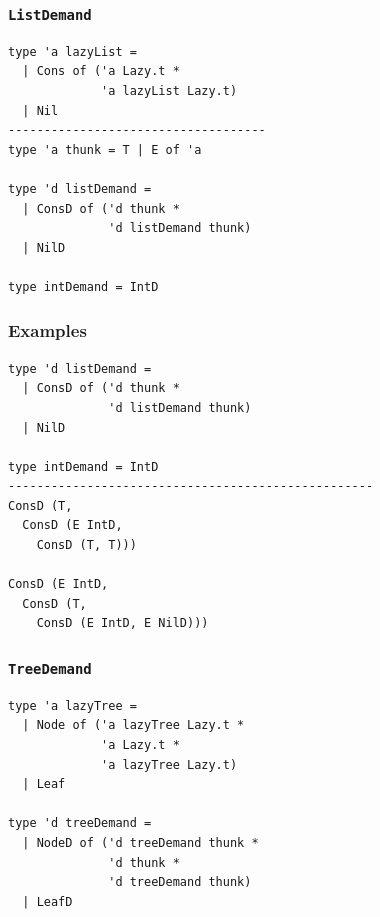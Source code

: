\documentclass{beamer}
\begin{document}
\begin{frame}[fragile]
\frametitle{\texttt{ListDemand}}
\begin{verbatim}
type 'a lazyList =
  | Cons of ('a Lazy.t *
             'a lazyList Lazy.t)
  | Nil
------------------------------------
type 'a thunk = T | E of 'a

type 'd listDemand =
  | ConsD of ('d thunk *
              'd listDemand thunk)
  | NilD

type intDemand = IntD
\end{verbatim}
\end{frame}


\begin{frame}[fragile]
\frametitle{Examples}
\begin{verbatim}
type 'd listDemand =
  | ConsD of ('d thunk *
              'd listDemand thunk)
  | NilD

type intDemand = IntD
---------------------------------------------------
ConsD (T,
  ConsD (E IntD,
    ConsD (T, T)))

ConsD (E IntD,
  ConsD (T,
    ConsD (E IntD, E NilD)))
\end{verbatim}
\end{frame}


\begin{frame}[fragile]
\frametitle{\texttt{TreeDemand}}
\begin{verbatim}
type 'a lazyTree =
  | Node of ('a lazyTree Lazy.t *
             'a Lazy.t *
             'a lazyTree Lazy.t)
  | Leaf

type 'd treeDemand =
  | NodeD of ('d treeDemand thunk *
              'd thunk *
              'd treeDemand thunk)
  | LeafD
\end{verbatim}
\end{frame}
\end{document}
